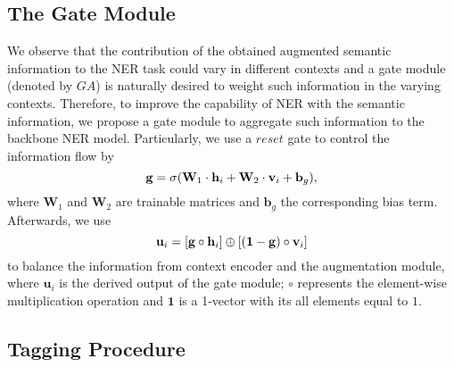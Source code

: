 \documentclass[11pt,a4paper]{article}
\begin{document}
\subsection{The Gate Module}


We observe that the contribution of the obtained augmented semantic information to the NER task could vary in different contexts and
a gate module (denoted by ${GA}$) is naturally desired to weight such information in the varying contexts.
Therefore, to improve the capability of NER with the semantic information, we propose a gate module to aggregate such information to the backbone NER model.
Particularly,
we use a $reset$ gate to control the information flow by
\begin{equation}
    \setlength\abovedisplayskip{5pt}
    \setlength\belowdisplayskip{5pt}
    \mathbf{g} = \sigma(\mathbf{W}_1 \cdot \mathbf{h}_i + \mathbf{W}_2 \cdot \mathbf{v}_i + \mathbf{b}_g), 
\end{equation}
where $\mathbf{W}_1$ and $\mathbf{W}_2$ are trainable matrices and $\mathbf{b}_g$ the corresponding bias term.
Afterwards, we use
\begin{equation}
    \setlength\abovedisplayskip{5pt}
    \setlength\belowdisplayskip{5pt}
    \mathbf{u}_i = [\mathbf{g} \circ \mathbf{h}_i] \oplus [(\mathbf{1} - \mathbf{g}) \circ \mathbf{v}_i]
\end{equation}
to balance the information from context encoder and the augmentation module, where $\mathbf{u}_i$ is the derived output of the gate module;
$\circ$ represents the element-wise multiplication operation and $\mathbf{1}$ is a 1-vector with its all elements equal to $1$.


\subsection{Tagging Procedure}
\end{document}
